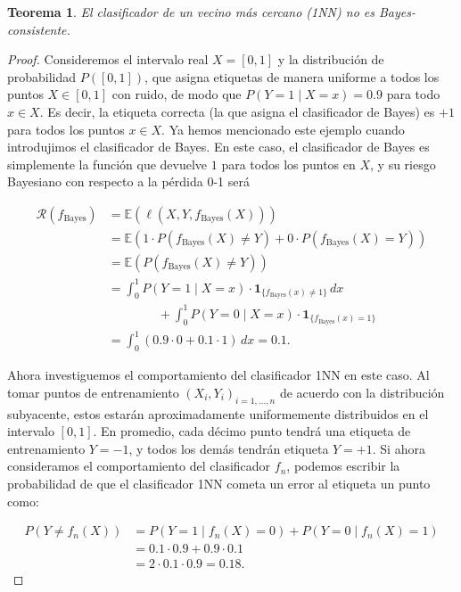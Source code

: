 \documentclass{report}
\newtheorem{thm}{Teorema}[section]
\begin{document}
\begin{thm}
    El clasificador de un vecino más cercano (1NN) no es Bayes-consistente.
\end{thm}

\begin{proof}

Consideremos
el intervalo real \(X = [0, 1]\) y la distribución de probabilidad \(P([0, 1])\),  que asigna etiquetas
de manera uniforme a todos los puntos \(X \in [0, 1]\) con ruido, de modo que
\(P(Y = 1 \mid X = x) = 0.9\) para todo \(x \in X\). Es decir, la etiqueta correcta (la que
asigna el clasificador de Bayes) es \(+1\) para todos los puntos \(x \in X\). Ya hemos mencionado
este ejemplo cuando introdujimos el clasificador de Bayes. En este caso, el clasificador de Bayes
es simplemente la función que devuelve \(1\) para todos los puntos en \(X\), y su riesgo Bayesiano
con respecto a la pérdida 0-1 será

\[
\begin{aligned}
    \mathcal{R}(f_{\text{Bayes}}) & = \mathbb{E}(\ell(X,Y,f_{\text{Bayes}}(X))) \\
    & = \mathbb{E}(1\cdot P(f_{\text{Bayes}}(X)\neq Y) + 0 \cdot P(f_{\text{Bayes}}(X) = Y))\\
    & = \mathbb{E}(P(f_{\text{Bayes}}(X)\neq Y))\\
    & = \int_{0}^{1} P(Y = 1 \mid X = x) \cdot \mathbf{1}_{\{f_{\text{Bayes}}(x) \neq 1\}} \, dx \\
    & \qquad \qquad + \int_{0}^{1} P(Y=0 \mid X=x) \cdot \mathbf{1}_{\{f_{\text{Bayes}}(x) = 1\}} \\
    & = \int_{0}^{1} (0.9 \cdot 0 + 0.1 \cdot 1) \, dx = 0.1.
\end{aligned}
\]

Ahora investiguemos el comportamiento del clasificador 1NN
en este caso. Al tomar puntos de entrenamiento \((X_i, Y_i)_{i=1,\dots,n}\) de acuerdo con la
distribución subyacente, estos estarán aproximadamente uniformemente distribuidos en el intervalo
\([0, 1]\). En promedio, cada décimo punto tendrá una etiqueta de entrenamiento \(Y = -1\), y todos
los demás tendrán etiqueta \(Y = +1\). Si ahora consideramos el comportamiento del clasificador \(f_n\),
podemos escribir la probabilidad de que el clasificador 1NN cometa un error al etiqueta un punto como:

\[
\begin{aligned}
P(Y \neq f_n(X)) & = P(Y = 1 \mid f_n(X) = 0) + P(Y = 0 \mid f_n(X) = 1) \\
                 & = 0.1 \cdot 0.9 + 0.9 \cdot 0.1 \\
                 & = 2 \cdot 0.1 \cdot 0.9 = 0.18.
\end{aligned}
\]


\end{proof}
\end{document}
